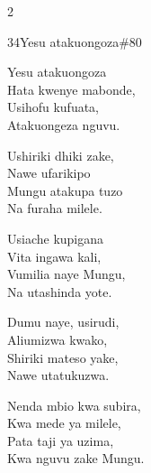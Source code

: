 \documentclass{article}
\begin{document}
\begin{multicols}{2}
\begin{hymn}{34}{Yesu atakuongoza}{\#80}
\begin{stanza}
Yesu atakuongoza\\
Hata kwenye mabonde,\\
Usihofu kufuata,\\
Atakuongeza nguvu.
\end{stanza}
\begin{chorus}
Ushiriki dhiki zake,\\
Nawe ufarikipo\\
Mungu atakupa tuzo\\
Na furaha milele.
\end{chorus}
\begin{stanza}
Usiache kupigana\\
Vita ingawa kali,\\
Vumilia naye Mungu,\\
Na utashinda yote.
\end{stanza}
\begin{stanza}
Dumu naye, usirudi,\\
Aliumizwa kwako,\\
Shiriki mateso yake,\\
Nawe utatukuzwa.
\end{stanza}
\begin{stanza}
Nenda mbio kwa subira,\\
Kwa mede ya milele,\\
Pata taji ya uzima,\\
Kwa nguvu zake Mungu.
\end{stanza}
\end{hymn}


\end{multicols}
\end{document}
